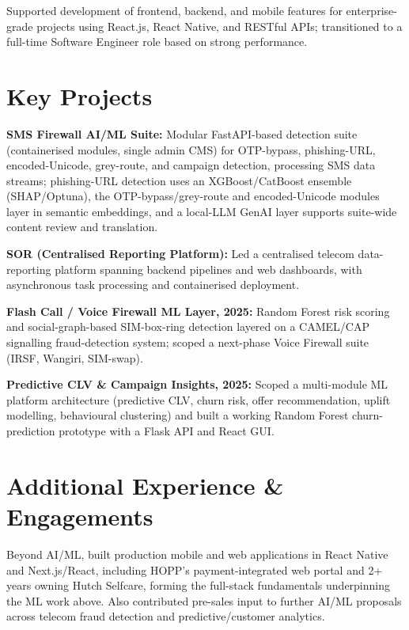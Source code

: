 \documentclass[10.5pt]{article}
\begin{document}
\begin{cvitems}
  \item Supported development of frontend, backend, and mobile features for enterprise-grade projects using React.js, React Native, and RESTful APIs; transitioned to a full-time Software Engineer role based on strong performance.
\end{cvitems}

\section*{Key Projects}
\begin{cvitems}
  \item \textbf{SMS Firewall AI/ML Suite:} Modular FastAPI-based detection suite (containerised modules, single admin CMS) for OTP-bypass, phishing-URL, encoded-Unicode, grey-route, and campaign detection, processing SMS data streams; phishing-URL detection uses an XGBoost/CatBoost ensemble (SHAP/Optuna), the OTP-bypass/grey-route and encoded-Unicode modules layer in semantic embeddings, and a local-LLM GenAI layer supports suite-wide content review and translation.
  \item \textbf{SOR (Centralised Reporting Platform):} Led a centralised telecom data-reporting platform spanning backend pipelines and web dashboards, with asynchronous task processing and containerised deployment.
  \item \textbf{Flash Call / Voice Firewall ML Layer, 2025:} Random Forest risk scoring and social-graph-based SIM-box-ring detection layered on a CAMEL/CAP signalling fraud-detection system; scoped a next-phase Voice Firewall suite (IRSF, Wangiri, SIM-swap).
  \item \textbf{Predictive CLV \& Campaign Insights, 2025:} Scoped a multi-module ML platform architecture (predictive CLV, churn risk, offer recommendation, uplift modelling, behavioural clustering) and built a working Random Forest churn-prediction prototype with a Flask API and React GUI.
\end{cvitems}

\section*{Additional Experience \& Engagements}
Beyond AI/ML, built production mobile and web applications in React Native and Next.js/React, including HOPP's payment-integrated web portal and 2+ years owning Hutch Selfcare, forming the full-stack fundamentals underpinning the ML work above. Also contributed pre-sales input to further AI/ML proposals across telecom fraud detection and predictive/customer analytics.
\end{document}

